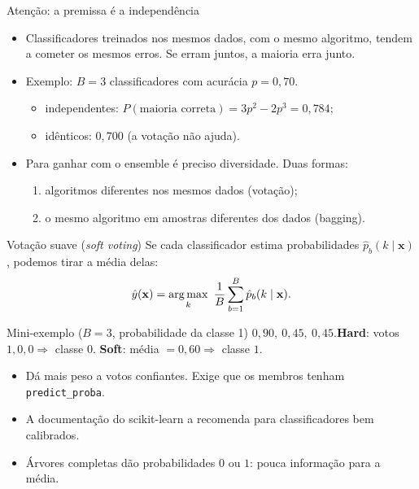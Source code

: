 \begin{frame}{Atenção: a premissa é a independência}
\begin{itemize}
  \item Classificadores treinados nos \alert{mesmos dados}, com o mesmo algoritmo, tendem a cometer os \alert{mesmos erros}. Se erram juntos, a maioria erra junto.
  \item Exemplo: $B=3$ classificadores com acurácia $p=0{,}70$.
  \begin{itemize}
    \item independentes: $P(\text{maioria correta})=3p^2-2p^3=0{,}784$;
    \item idênticos: $0{,}700$ (a votação não ajuda).
  \end{itemize}
  \item Para ganhar com o ensemble é preciso \alert{diversidade}. Duas formas:
  \begin{enumerate}
    \item \alert{algoritmos diferentes} nos mesmos dados (votação);
    \item o \alert{mesmo algoritmo} em \alert{amostras diferentes} dos dados (bagging).
  \end{enumerate}
\end{itemize}
\end{frame}

\begin{frame}{Votação suave (\emph{soft voting})}
Se cada classificador estima probabilidades $\hat p_b(k\mid\mathbf x)$, podemos \alert{tirar a média} delas:
\[
\hat y(\mathbf x)=\argmax_{k}\ \frac1B\sum_{b=1}^{B}\hat p_b(k\mid\mathbf x).
\]
\begin{block}{Mini-exemplo ($B=3$, probabilidade da classe 1)}
$0{,}90,\ 0{,}45,\ 0{,}45$.\quad \textbf{Hard}: votos $1,0,0\Rightarrow$ classe $0$. \quad \textbf{Soft}: média $=0{,}60\Rightarrow$ classe $1$.
\end{block}
\begin{itemize}
  \item Dá mais peso a votos \alert{confiantes}. Exige que os membros tenham \texttt{predict\_proba}.
  \item A documentação do scikit-learn a recomenda para classificadores \alert{bem calibrados}.
  \item Árvores completas dão probabilidades $0$ ou $1$: pouca informação para a média.
\end{itemize}
\end{frame}

